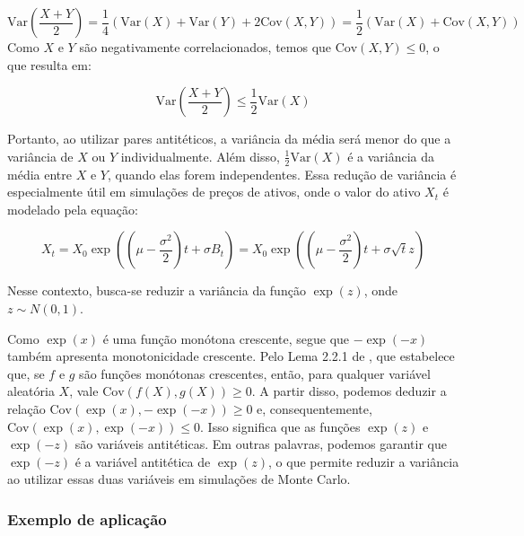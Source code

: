 \documentclass[12pt,openright,oneside,a4paper]{abntex2}
\numberwithin{equation}{section}
\begin{document}
\[
\text{Var}\left(\frac{X+Y}{2}\right) = \frac{1}{4} \left(\text{Var}(X) + \text{Var}(Y) + 2\text{Cov}(X,Y)\right)
= \frac{1}{2} \left(\text{Var}(X) + \text{Cov}(X,Y)\right)
\]
Como \( X \) e \( Y \) são negativamente correlacionados, temos que \( \text{Cov}(X, Y) \leq 0 \), o que resulta em:

\[
\text{Var}\left(\frac{X+Y}{2}\right) \leq \frac{1}{2}\text{Var}(X)
\] 

Portanto, ao utilizar pares antitéticos, a variância da média será menor do que a variância de \( X \) ou \( Y \) individualmente. Além disso, $\frac{1}{2}\text{Var}(X)$ é a variância  da média entre $X$ e $Y$, quando elas forem independentes. Essa redução de variância é especialmente útil em simulações de preços de ativos, onde o valor do ativo \( X_t \) é modelado pela equação:

\[
X_t = X_0 \exp\left( \left(\mu - \frac{\sigma^2}{2}\right)t + \sigma B_t \right) = X_0 \exp\left( \left(\mu - \frac{\sigma^2}{2}\right)t + \sigma \sqrt t z \right)
\]

Nesse contexto, busca-se reduzir a variância da função \( \exp(z) \), onde \( z \sim N(0,1) \).


Como \( \exp(x) \) é uma função monótona crescente, segue que \(- \exp(-x) \) também apresenta monotonicidade crescente. Pelo Lema 2.2.1 de \textcite{silva2012}, que estabelece que, se \(f\) e \(g\) são funções monótonas crescentes, então, para qualquer variável aleatória \(X\), vale \(\text{Cov}(f(X), g(X)) \geq 0\). A partir disso, podemos deduzir a relação \(\text{Cov}(\exp(x), -\exp(-x)) \geq 0\) e, consequentemente, \(\text{Cov}(\exp(x), \exp(-x)) \leq 0\). Isso significa que as funções \( \exp(z) \) e \( \exp(-z) \) são variáveis antitéticas. Em outras palavras, podemos garantir que \( \exp(-z) \) é a variável antitética de \( \exp(z) \), o que permite reduzir a variância ao utilizar essas duas variáveis em simulações de Monte Carlo.
 
\subsubsection{Exemplo de aplicação}
\end{document}
